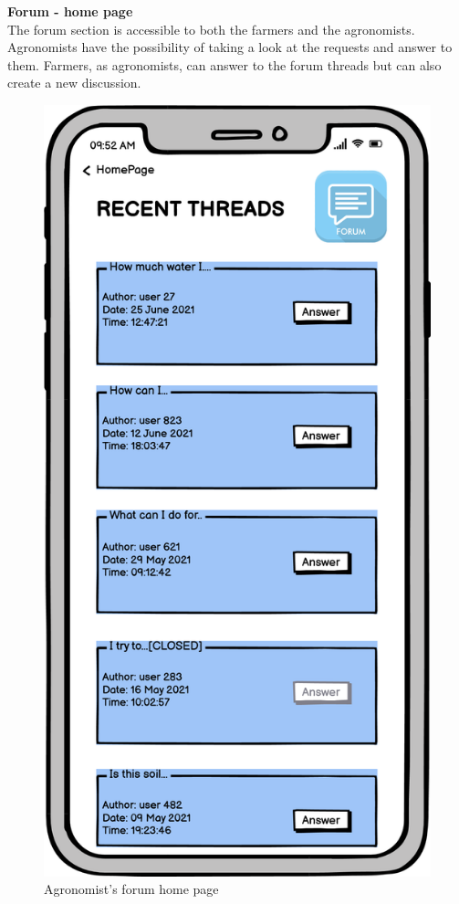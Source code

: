 \newpage
\textbf{Forum - home page} \\
The forum section is accessible to both the farmers and the agronomists. Agronomists have the possibility
of taking a look at the requests and answer to them. Farmers, as agronomists, can answer to the forum threads
but can also create a new discussion.
\begin{figure}[H]
    \centering
    \includegraphics[scale=0.40]{Images/agronomistForum.png}
    \caption{Agronomist's forum home page}
\end{figure}
